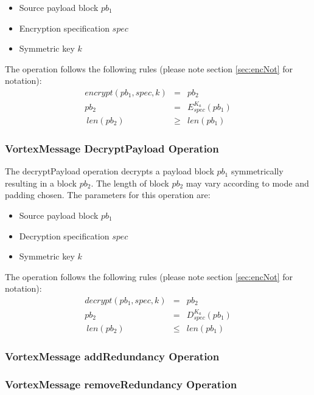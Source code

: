 \begin{itemize}
	\item Source payload block $pb_1$
	\item Encryption specification $spec$
	\item Symmetric key $k$
\end{itemize}

The operation follows the following rules (please note section \ref{sec:encNot} for notation):
\begin{eqnarray}
encrypt(pb_1, spec, k) & = & pb_2 \\
pb_2 & = & E_{spec}^{K_a}\left( pb_1 \right)\\\
len(pb_2) & \geq & len(pb_1)
\end{eqnarray}


\subsubsection{VortexMessage DecryptPayload Operation}
The decryptPayload operation decrypts a payload block $pb_1$ symmetrically resulting in a block $pb_2$. The length of block $pb_2$ may vary according to mode and padding chosen. The parameters for this operation are:

\begin{itemize}
	\item Source payload block $pb_1$
	\item Decryption specification $spec$
	\item Symmetric key $k$
\end{itemize}

The operation follows the following rules (please note section \ref{sec:encNot} for notation):
\begin{eqnarray}
decrypt(pb_1, spec, k) & = & pb_2 \\
pb_2 & = & D_{spec}^{K_a}\left( pb_1 \right)\\\
len(pb_2) & \leq & len(pb_1)
\end{eqnarray}

\subsubsection{VortexMessage addRedundancy Operation}

\subsubsection{VortexMessage removeRedundancy Operation}



